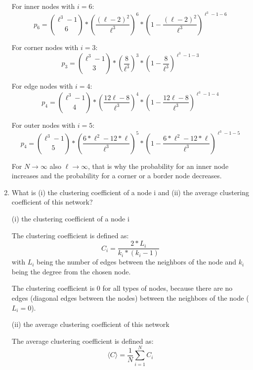 \begin{enumerate}
	For inner nodes with $i=6$:
	\begin{equation}
	p_6 = {{\ell^3-1}\choose{6}} * (\frac{(\ell-2)^2}{\ell^3})^6 * (1-{\frac{(\ell-2)^2}{\ell^3}})^{\ell^3-1-6}
	\end{equation}
	
	For corner nodes with $i=3$:
	\begin{equation}
	p_3 = {{\ell^3-1}\choose{3}} * ({\frac{8}{\ell^3}})^3 * (1-{\frac{8}{\ell^3}})^{\ell^3-1-3}
	\end{equation}
	
	For edge nodes with $i=4$:
	\begin{equation}
	p_4 = {{\ell^3-1}\choose{4}} * ({\frac{12 \ell - 8}{\ell^3}})^4 * (1-{\frac{12 \ell - 8}{\ell^3}})^{\ell^3-1-4}
	\end{equation}
	
	For outer nodes with $i=5$:
	\begin{equation}
	p_4 = {{\ell^3-1}\choose{5}} * ({\frac{6*\ell^2 - 12*\ell}{\ell^3}})^5 * (1-{\frac{6*\ell^2 - 12*\ell}{\ell^3}})^{\ell^3-1-5}
	\end{equation}
	
	For $N \rightarrow \infty$ also $\ell \rightarrow \infty$, that is why the probability for an inner node increases and the probability for a corner or a border node decreases.
	
	\item What is (i) the clustering coefficient of a node i and (ii) the average clustering coefficient of this network?
	\vspace{0.25cm}
	
	(i) the clustering coefficient of a node i
	
	The clustering coefficient is defined as:
	\begin{equation}
	C_i = \frac{2*L_i}{k_i * (k_i-1)}
	\end{equation}
	with $L_i$ being the number of edges between the neighbors of the node and $k_i$ being the degree from the chosen node.
	
	The clustering coefficient is 0 for all types of nodes, because there are no edges (diagonal edges between the nodes) between the neighbors of the node ($L_i = 0$).
	
	(ii) the average clustering coefficient of this network
	
	The average clustering coefficient is defined as:
	\begin{equation}
	\langle C \rangle = \frac{1}{N} \sum_{i=1}^{N} C_i
	\end{equation}
	

\end{enumerate}
